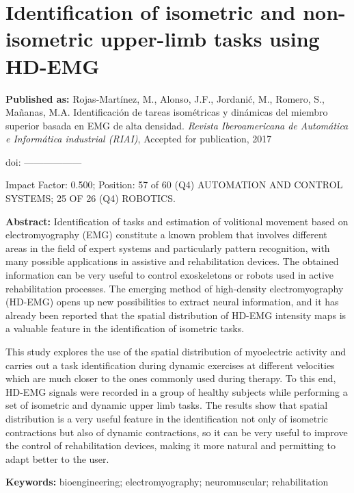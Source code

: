 \newpage
{}


\chapter[Isometric and non-isometric task identification]{Identification of isometric and non-isometric upper-limb tasks using HD-EMG}
\label{RIAI}
\textbf{Published as:} 
Rojas-Mart\'inez, M., Alonso, J.F., Jordani\'c, M., Romero, S., Ma\~nanas, M.A.
Identificación de tareas isométricas y dinámicas del miembro superior basada en EMG de alta densidad.
\textit{Revista Iberoamericana de Autom\'atica e Inform\'atica industrial (RIAI)}, Accepted for publication, 2017

doi: ------------------

Impact Factor: 0.500; Position: 57 of 60 (Q4) AUTOMATION AND CONTROL SYSTEMS; 25 OF 26 (Q4) ROBOTICS.


\textbf{Abstract:} Identification of tasks and estimation of volitional movement based on electromyography (EMG) constitute a known problem that involves different areas in the field of expert systems and particularly pattern recognition, with many possible applications in assistive and rehabilitation devices. The obtained information can be very useful to control exoskeletons or robots used in active rehabilitation processes. The emerging method of high-density electromyography (HD-EMG) opens up new possibilities to extract neural information, and it has already been reported that the spatial distribution of HD-EMG intensity maps is a valuable feature in the identification of isometric tasks.

This study explores the use of the spatial distribution of myoelectric activity and carries out a task identification during dynamic exercises at different velocities which are much closer to the ones commonly used during therapy. To this end, HD-EMG signals were recorded in a group of healthy subjects while performing a set of isometric and dynamic upper limb tasks. The results show that spatial distribution is a very useful feature in the identification not only of isometric contractions but also of dynamic contractions, so it can be very useful to improve the control of rehabilitation devices, making it more natural and permitting to adapt better to the user.

\textbf{Keywords:}  bioengineering; electromyography; neuromuscular; rehabilitation


